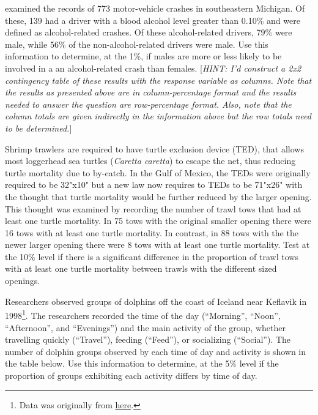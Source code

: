 \documentclass[10pt,openany]{book}\usepackage[]{graphicx}\usepackage[]{color}
\begin{document}
\begin{exsection}
  \item \label{revex:ChiMVC} \rhw{} \cite{Melikeretal2004} examined the records of 773 motor-vehicle crashes in southeastern Michigan.  Of these, 139 had a driver with a blood alcohol level greater than 0.10\% and were defined as alcohol-related crashes.  Of these alcohol-related drivers, 79\% were male, while 56\% of the non-alcohol-related drivers were male.  Use this information to determine, at the 1\%, if males are more or less likely to be involved in a an alcohol-related crash than females.  [\textit{HINT: I'd construct a 2x2 contingency table  of these results with the response variable as columns.  Note that the results as presented above are in column-percentage format and the results needed to answer the question are row-percentage format.  Also, note that the column totals are given indirectly in the information above but the row totals need to be determined.}] 

  \item \label{revex:ChiByCatch} \rhw{} Shrimp trawlers are required to have turtle exclusion device (TED), that allows most loggerhead sea turtles (\textit{Caretta caretta}) to escape the net, thus reducing turtle mortality due to by-catch.  In the Gulf of Mexico, the TEDs were originally required to be 32"x10" but a new law now requires to TEDs to be 71"x26" with the thought that turtle mortality would be further reduced by the larger opening.  This thought was examined by recording the number of trawl tows that had at least one turtle mortality.  In 75 tows with the original smaller opening there were 16 tows with at least one turtle mortality.  In contrast, in 88 tows with the the newer larger opening there were 8 tows with at least one turtle mortality.  Test at the 10\% level if there is a significant difference in the proportion of trawl tows with at least one turtle mortality between trawls with the different sized openings.

  \item \label{revex:ChiDolphins} \rhw{} Researchers observed groups of dolphins off the coast of Iceland near Keflavik in 1998\footnote{Data was originally from \href{http://www.statsci.org/data/general/dolpacti.html}{here}.}.  The researchers recorded the time of the day (``Morning'', ``Noon'', ``Afternoon'', and ``Evenings'') and the main activity of the group, whether travelling quickly (``Travel''), feeding (``Feed''), or socializing (``Social'').  The number of dolphin groups observed by each time of day and activity is shown in the table below.  Use this information to determine, at the 5\% level if the proportion of groups exhibiting each activity differs by time of day. 


\end{exsection}
\end{document}
